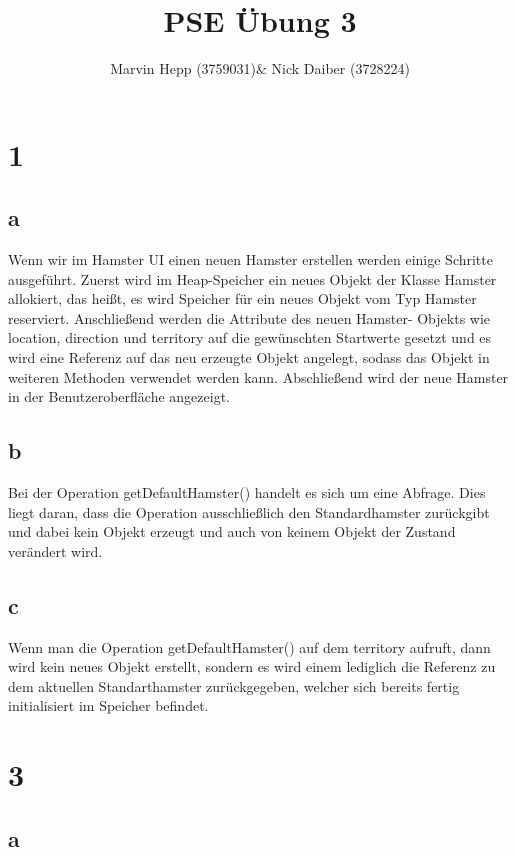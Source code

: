 \documentclass{article}
\title{PSE Übung 3}
\author{Marvin Hepp (3759031)\& Nick Daiber (3728224)}
\begin{document}
    \maketitle
    \section*{1}
    \subsection*{a}
    Wenn wir im Hamster UI einen neuen Hamster erstellen werden einige Schritte ausgeführt. Zuerst
    wird im Heap-Speicher ein neues Objekt der Klasse Hamster allokiert, das heißt, es wird Speicher für
    ein neues Objekt vom Typ Hamster reserviert. Anschließend werden die Attribute des neuen Hamster-
    Objekts wie location, direction und territory auf die gewünschten Startwerte gesetzt und es wird eine
    Referenz auf das neu erzeugte Objekt angelegt, sodass das Objekt in weiteren Methoden verwendet
    werden kann. Abschließend wird der neue Hamster in der Benutzeroberfläche angezeigt.
    \subsection*{b}
    Bei der Operation getDefaultHamster() handelt es sich um eine Abfrage. Dies liegt daran, dass die
    Operation ausschließlich den Standardhamster zurückgibt und dabei kein Objekt erzeugt und auch von
    keinem Objekt der Zustand verändert wird.
    \subsection*{c}
    Wenn man die Operation getDefaultHamster() auf dem territory aufruft, dann wird kein neues Objekt
    erstellt, sondern es wird einem lediglich die Referenz zu dem aktuellen Standarthamster
    zurückgegeben, welcher sich bereits fertig initialisiert im Speicher befindet.

    \newpage
    \section*{3}
    \subsection*{a}
\end{document}
